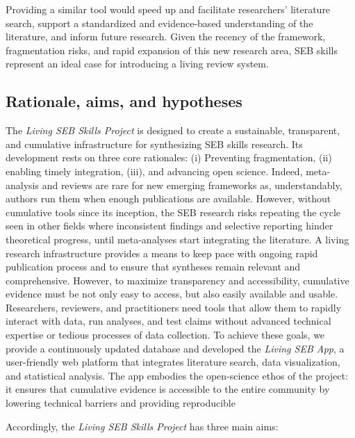 \documentclass[
  man,
  longtable,
  nolmodern,
  notxfonts,
  notimes,
  colorlinks=true,linkcolor=blue,citecolor=blue,urlcolor=blue]{apa7}
\begin{document}
Providing a similar tool would speed up and facilitate researchers'
literature search, support a standardized and evidence-based
understanding of the literature, and inform future research. Given the
recency of the framework, fragmentation risks, and rapid expansion of
this new research area, SEB skills represent an ideal case for
introducing a living review system.

\subsection{Rationale, aims, and
hypotheses}\label{rationale-aims-and-hypotheses}

The \emph{Living SEB Skills Project} is designed to create a
sustainable, transparent, and cumulative infrastructure for synthesizing
SEB skills research. Its development rests on three core rationales: (i)
Preventing fragmentation, (ii) enabling timely integration, (iii), and
advancing open science. Indeed, meta-analysis and reviews are rare for
new emerging frameworks as, understandably, authors run them when enough
publications are available. However, without cumulative tools since its
inception, the SEB research risks repeating the cycle seen in other
fields where inconsistent findings and selective reporting hinder
theoretical progress, until meta-analyses start integrating the
literature. A living research infrastructure provides a means to keep
pace with ongoing rapid publication process and to ensure that syntheses
remain relevant and comprehensive. However, to maximize transparency and
accessibility, cumulative evidence must be not only easy to access, but
also easily available and usable. Researchers, reviewers, and
practitioners need tools that allow them to rapidly interact with data,
run analyses, and test claims without advanced technical expertise or
tedious processes of data collection. To achieve these goals, we provide
a continuously updated database and developed the \emph{Living SEB App},
a user-friendly web platform that integrates literature search, data
visualization, and statistical analysis. The app embodies the
open-science ethos of the project: it ensures that cumulative evidence
is accessible to the entire community by lowering technical barriers and
providing reproducible

Accordingly, the \emph{Living SEB Skills Project} has three main aims:
\end{document}
